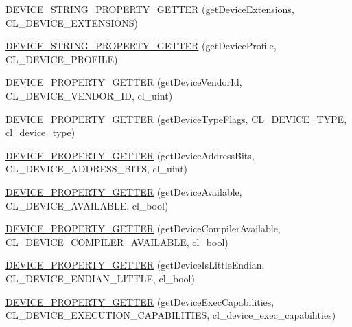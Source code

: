 \begin{DoxyCompactItemize}
\item 
\hyperlink{class_c_l_ray_tracer_1_1_open_c_l_utils_1_1_c_l_device_adb801df04a0df25fb8917e1e8445da74}{D\+E\+V\+I\+C\+E\+\_\+\+S\+T\+R\+I\+N\+G\+\_\+\+P\+R\+O\+P\+E\+R\+T\+Y\+\_\+\+G\+E\+T\+T\+ER} (get\+Device\+Extensions, C\+L\+\_\+\+D\+E\+V\+I\+C\+E\+\_\+\+E\+X\+T\+E\+N\+S\+I\+O\+NS)
\item 
\hyperlink{class_c_l_ray_tracer_1_1_open_c_l_utils_1_1_c_l_device_acfcc6e1639f77a443639876e7c7dc8eb}{D\+E\+V\+I\+C\+E\+\_\+\+S\+T\+R\+I\+N\+G\+\_\+\+P\+R\+O\+P\+E\+R\+T\+Y\+\_\+\+G\+E\+T\+T\+ER} (get\+Device\+Profile, C\+L\+\_\+\+D\+E\+V\+I\+C\+E\+\_\+\+P\+R\+O\+F\+I\+LE)
\item 
\hyperlink{class_c_l_ray_tracer_1_1_open_c_l_utils_1_1_c_l_device_a926f2555eb8cb788c74d2be990b286a3}{D\+E\+V\+I\+C\+E\+\_\+\+P\+R\+O\+P\+E\+R\+T\+Y\+\_\+\+G\+E\+T\+T\+ER} (get\+Device\+Vendor\+Id, C\+L\+\_\+\+D\+E\+V\+I\+C\+E\+\_\+\+V\+E\+N\+D\+O\+R\+\_\+\+ID, cl\+\_\+uint)
\item 
\hyperlink{class_c_l_ray_tracer_1_1_open_c_l_utils_1_1_c_l_device_a72694d79242e5e855b498a4377bda06d}{D\+E\+V\+I\+C\+E\+\_\+\+P\+R\+O\+P\+E\+R\+T\+Y\+\_\+\+G\+E\+T\+T\+ER} (get\+Device\+Type\+Flags, C\+L\+\_\+\+D\+E\+V\+I\+C\+E\+\_\+\+T\+Y\+PE, cl\+\_\+device\+\_\+type)
\item 
\hyperlink{class_c_l_ray_tracer_1_1_open_c_l_utils_1_1_c_l_device_ac2e8517d1524656fac8b6e785a386a73}{D\+E\+V\+I\+C\+E\+\_\+\+P\+R\+O\+P\+E\+R\+T\+Y\+\_\+\+G\+E\+T\+T\+ER} (get\+Device\+Address\+Bits, C\+L\+\_\+\+D\+E\+V\+I\+C\+E\+\_\+\+A\+D\+D\+R\+E\+S\+S\+\_\+\+B\+I\+TS, cl\+\_\+uint)
\item 
\hyperlink{class_c_l_ray_tracer_1_1_open_c_l_utils_1_1_c_l_device_ad35e10019225dc68875ece12b5206e7e}{D\+E\+V\+I\+C\+E\+\_\+\+P\+R\+O\+P\+E\+R\+T\+Y\+\_\+\+G\+E\+T\+T\+ER} (get\+Device\+Available, C\+L\+\_\+\+D\+E\+V\+I\+C\+E\+\_\+\+A\+V\+A\+I\+L\+A\+B\+LE, cl\+\_\+bool)
\item 
\hyperlink{class_c_l_ray_tracer_1_1_open_c_l_utils_1_1_c_l_device_adbd8ea9ea4d6350c6654c62756c828df}{D\+E\+V\+I\+C\+E\+\_\+\+P\+R\+O\+P\+E\+R\+T\+Y\+\_\+\+G\+E\+T\+T\+ER} (get\+Device\+Compiler\+Available, C\+L\+\_\+\+D\+E\+V\+I\+C\+E\+\_\+\+C\+O\+M\+P\+I\+L\+E\+R\+\_\+\+A\+V\+A\+I\+L\+A\+B\+LE, cl\+\_\+bool)
\item 
\hyperlink{class_c_l_ray_tracer_1_1_open_c_l_utils_1_1_c_l_device_ab9f7a62d26cd1ece0f7ec313b8c60030}{D\+E\+V\+I\+C\+E\+\_\+\+P\+R\+O\+P\+E\+R\+T\+Y\+\_\+\+G\+E\+T\+T\+ER} (get\+Device\+Is\+Little\+Endian, C\+L\+\_\+\+D\+E\+V\+I\+C\+E\+\_\+\+E\+N\+D\+I\+A\+N\+\_\+\+L\+I\+T\+T\+LE, cl\+\_\+bool)
\item 
\hyperlink{class_c_l_ray_tracer_1_1_open_c_l_utils_1_1_c_l_device_a04ef60e9fac8112191cc94d81397d594}{D\+E\+V\+I\+C\+E\+\_\+\+P\+R\+O\+P\+E\+R\+T\+Y\+\_\+\+G\+E\+T\+T\+ER} (get\+Device\+Exec\+Capabilities, C\+L\+\_\+\+D\+E\+V\+I\+C\+E\+\_\+\+E\+X\+E\+C\+U\+T\+I\+O\+N\+\_\+\+C\+A\+P\+A\+B\+I\+L\+I\+T\+I\+ES, cl\+\_\+device\+\_\+exec\+\_\+capabilities)
\end{DoxyCompactItemize}
